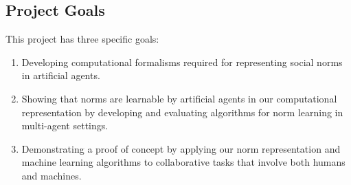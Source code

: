 \subsection{Project Goals}
\label{sec:goals}

This project has three specific goals:

\begin{enumerate}


\item Developing computational formalisms required for representing
  social norms in artificial agents.

\item Showing that norms are learnable by artificial agents in our
  computational representation by developing and evaluating algorithms
  for norm learning in multi-agent settings.

\item Demonstrating a proof of concept by applying our norm
  representation and machine learning algorithms to collaborative
  tasks that involve both humans and machines.

\end{enumerate}



